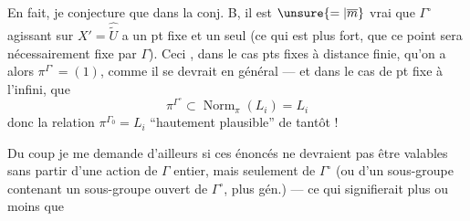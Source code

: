 En fait, je conjecture que dans la conj. B, il est $\unsure{=|\overline m}$ vrai que $\Gamma^\circ$ agissant sur $X'=\widehat{\widetilde U}$ a un pt fixe et un seul (ce qui est plus fort, que ce point  sera nécessairement fixe par $\Gamma$). Ceci , dans le cas  pts fixes à distance finie, qu'on a alors $\pi^{\Gamma^\circ}=(1)$, comme il se devrait en général --- et dans le cas de pt fixe à l'infini, que
\[
\pi^{\Gamma^\circ}\subset\operatorname{Norm}_{\pi}(L_i)=L_i
\]
donc la relation $\pi^{\Gamma_0}=L_i$ ``hautement plausible'' de tantôt !

Du coup je me demande d'ailleurs si ces énoncés ne devraient pas être valables sans partir d'une action de $\Gamma$  entier, mais seulement de $\Gamma^\circ$ (ou d'un sous-groupe contenant un sous-groupe ouvert de $\Gamma^\circ$, plus gén.) --- ce qui signifierait plus ou moins que
